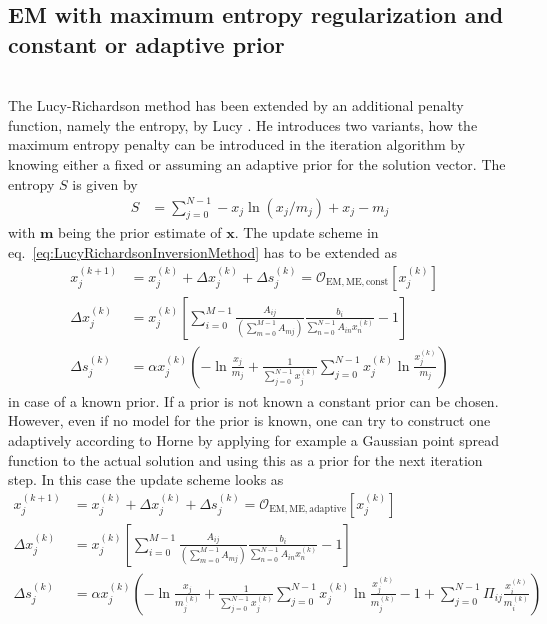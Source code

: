 \subsection{EM with maximum entropy regularization and constant or adaptive prior}~\\
The Lucy\hyp{}Richardson method \cite{Richardson1972,Lucy1974} has been extended by an additional penalty function,
namely the entropy, by Lucy \cite{Lucy1994}. He introduces two variants, how the maximum entropy penalty can be introduced in the iteration algorithm by knowing either a fixed or assuming an adaptive prior for the solution vector. The entropy $S$ is given by
\begin{align}
S&= \sum_{j=0}^{N-1} -x_j\ln\left(x_j/m_j\right) +x_j-m_j
\end{align}
with $\mathbf{m}$ being the prior estimate of $\mathbf{x}$. The update scheme in eq.\ \ref{eq:LucyRichardsonInversionMethod} has to be extended as
\begin{align}
\label{eq:LucyRichardsonInversionMethodMEconstant}
  x_j^{(k+1)} &= x_j^{(k)} + \Delta x_j^{(k)} + \Delta s_j^{(k)}= \mathcal{O}_\mathrm{EM,ME,const}\left[x_j^{(k)}\right]\\
  \Delta x_j^{(k)} &= x_j^{(k)}\left[\sum_{i=0}^{M-1}\frac{A_{ij}}{\left(\displaystyle \sum_{m=0}^{M-1}A_{mj}\right)}\frac{b_i}{\displaystyle \sum_{n=0}^{N-1}A_{in}x_n^{(k)}}-1\right] \\
  \Delta s_j^{(k)} &=  \alpha x_j^{(k)}\left(-\ln\frac{x_j}{m_j}+\frac{1}{\sum_{j=0}^{N-1}x_j^{(k)}}\sum_{j=0}^{N-1}x_j^{(k)}\ln\frac{x_j^{(k)}}{m_j}\right)
\end{align}
in case of a known prior. If a prior is not known a constant prior can be chosen. However, even if no model for the prior is known, one can try to construct one adaptively according to Horne \cite{Horne1985} by applying for example a Gaussian point spread function to the actual solution and using this as a prior for the next iteration step. In this case the update scheme looks as
\begin{align}
\label{eq:LucyRichardsonInversionMethodMEadaptive}
  x_j^{(k+1)} &= x_j^{(k)} + \Delta x_j^{(k)} + \Delta s_j^{(k)}= \mathcal{O}_\mathrm{EM,ME,adaptive}\left[x_j^{(k)}\right]\\
  \Delta x_j^{(k)} &= x_j^{(k)}\left[\sum_{i=0}^{M-1}\frac{A_{ij}}{\left(\displaystyle \sum_{m=0}^{M-1}A_{mj}\right)}\frac{b_i}{\displaystyle \sum_{n=0}^{N-1}A_{in}x_n^{(k)}}-1\right] \\
  \Delta s_j^{(k)} &=  \alpha x_j^{(k)}\left(-\ln\frac{x_j}{m_j^{(k)}}
                                +\frac{1}{\sum_{j=0}^{N-1}x_j^{(k)}}\sum_{j=0}^{N-1}x_j^{(k)}\ln\frac{x_j^{(k)}}{m_j^{(k)}}
                                -1+\sum_{j=0}^{N-1}\Pi_{ij}\frac{x_i^{(k)}}{m_i^{(k)}}\right)
\end{align}
